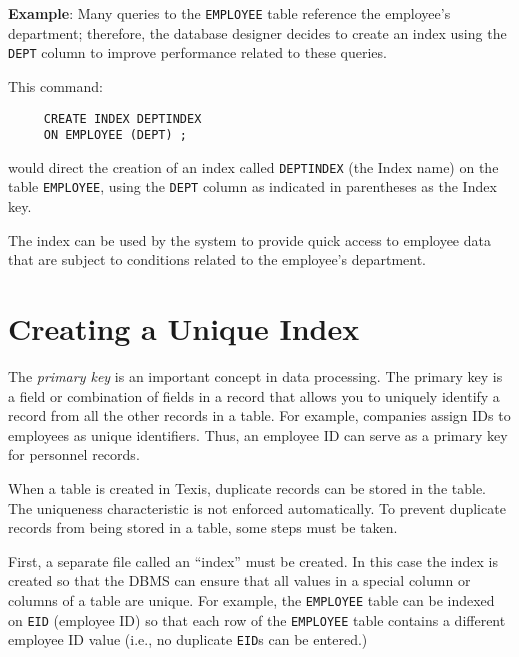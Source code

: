 {\bf Example}:
Many queries to the \verb`EMPLOYEE` table reference the employee's
department; therefore, the database designer decides to create an
index using the \verb`DEPT` column to improve performance related to these
queries.

This command:
\begin{verbatim}
     CREATE INDEX DEPTINDEX
     ON EMPLOYEE (DEPT) ;
\end{verbatim}

would direct the creation of an index called \verb`DEPTINDEX` (the
Index name) on the table \verb`EMPLOYEE`, using the
\verb`DEPT` column as indicated in parentheses as the Index key.

The index can be used by the system to provide quick access to
employee data that are subject to conditions related to the employee's
department.

\section{Creating a Unique Index}

The {\em primary key} is an important concept in data processing.  The
primary key is a field or combination of fields in a record that
allows you to uniquely identify a record from all the other records in
a table.  For example, companies assign IDs to employees as unique
identifiers.  Thus, an employee ID can serve as a primary key for
personnel records.

When a table is created in Texis, duplicate records can be stored in
the table.  The uniqueness characteristic is not enforced
automatically.  To prevent duplicate records from being stored in a
table, some steps must be taken.

First, a separate file called an ``index'' must be created.  In this
case the index is created so that the DBMS can ensure that all values
in a special column or columns of a table are unique.  For example,
the \verb`EMPLOYEE` table can be indexed on \verb`EID` (employee ID)
so that each row of the \verb`EMPLOYEE` table contains a different
employee ID value (i.e., no duplicate \verb`EID`s can be entered.)


